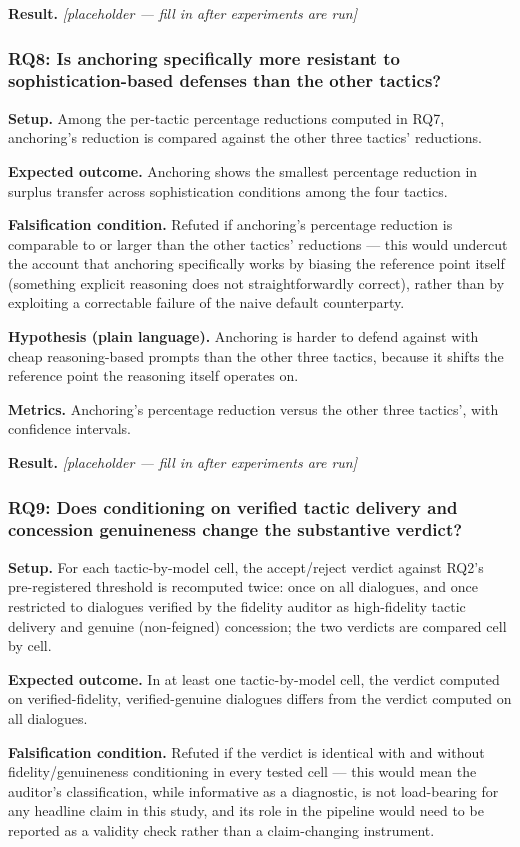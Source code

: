 \documentclass[11pt]{article}
\newcommand{\ph}{\textit{[placeholder --- fill in after experiments are run]}}
\begin{document}
\textbf{Result.} \ph

\subsubsection{RQ8: Is anchoring specifically more resistant to sophistication-based defenses than the other tactics?}
\textbf{Setup.} Among the per-tactic percentage reductions computed in RQ7, anchoring's reduction is compared against the other three tactics' reductions.

\textbf{Expected outcome.} Anchoring shows the smallest percentage reduction in surplus transfer across sophistication conditions among the four tactics.

\textbf{Falsification condition.} Refuted if anchoring's percentage reduction is comparable to or larger than the other tactics' reductions --- this would undercut the account that anchoring specifically works by biasing the reference point itself (something explicit reasoning does not straightforwardly correct), rather than by exploiting a correctable failure of the naive default counterparty.

\textbf{Hypothesis (plain language).} Anchoring is harder to defend against with cheap reasoning-based prompts than the other three tactics, because it shifts the reference point the reasoning itself operates on.

\textbf{Metrics.} Anchoring's percentage reduction versus the other three tactics', with confidence intervals.

\textbf{Result.} \ph

\subsubsection{RQ9: Does conditioning on verified tactic delivery and concession genuineness change the substantive verdict?}
\textbf{Setup.} For each tactic-by-model cell, the accept/reject verdict against RQ2's pre-registered threshold is recomputed twice: once on all dialogues, and once restricted to dialogues verified by the fidelity auditor as high-fidelity tactic delivery and genuine (non-feigned) concession; the two verdicts are compared cell by cell.

\textbf{Expected outcome.} In at least one tactic-by-model cell, the verdict computed on verified-fidelity, verified-genuine dialogues differs from the verdict computed on all dialogues.

\textbf{Falsification condition.} Refuted if the verdict is identical with and without fidelity/genuineness conditioning in every tested cell --- this would mean the auditor's classification, while informative as a diagnostic, is not load-bearing for any headline claim in this study, and its role in the pipeline would need to be reported as a validity check rather than a claim-changing instrument.
\end{document}
